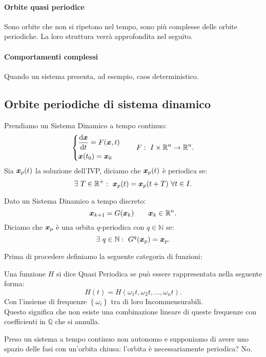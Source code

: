 \paragraph{Orbite quasi periodice}%
\label{par:Orbite quasi periodice}
Sono orbite che non si ripetono nel tempo, sono più complesse delle orbite periodiche. La loro struttura verrà approfondita nel seguito.
\paragraph{Comportamenti complessi}%
\label{par:Comportamenti complessi}
Quando un sistema presenta, ad esempio, caos deterministico.
\subsection{Orbite periodiche di sistema dinamico}%
\label{sub:Orbite periodiche di sistema dinamico}
\begin{defn}
Prendiamo un Sistema Dinamico a tempo continuo:
\[
    \begin{dcases}
	\frac{\text{d} \boldsymbol{x}}{\text{d} t} = F(\boldsymbol{x}, t)\\
	\boldsymbol{x} (t_0) = \boldsymbol{x}_0
    \end{dcases}
    \qquad
    F: \ I \times \mathbb{R}^n \to \mathbb{R}^n
.\] 
 Sia $\boldsymbol{x}_p(t)$ la soluzione dell'IVP, diciamo che $\boldsymbol{x}_p(t)$ è periodica se:
\[
    \exists \ T \in \mathbb{R}^+: \ \boldsymbol{x}_p(t) = \boldsymbol{x}_p (t + T) \  \forall t \in I
.\]    
\end{defn}
\noindent
\begin{defn}
    Dato un Sistema Dinamico a tempo discreto:
    \[
	\boldsymbol{x}_{k+1} = G(\boldsymbol{x}_k) \qquad \boldsymbol{x}_k \in \mathbb{R}^n
    .\] 
    Diciamo che $\boldsymbol{x}_p$ è una orbita $q$-periodica con $q \in \mathbb{N}$ se:
    \[
	\exists \ q \in \mathbb{N}: \
	G^{q} (\boldsymbol{x}_p) = \boldsymbol{x}_p
    .\] 
\end{defn}
\noindent
Prima di procedere definiamo la seguente categoria di funzioni:
\begin{defn}
    Una funzione $H$ si dice Quasi Periodica se può essere rappresentata nella seguente forma:
    \[
	H(t) = H(\omega_1t, \omega_2t, \ldots, \omega_nt)
    .\] 
    Con l'insieme di frequenze $\left\{\omega_i\right\}$ tra di loro Incommensurabili.\\
    Questo significa che non esiste una combinazione lineare di queste frequenze con coefficienti in $\mathbb{Q}$ che si annulla.
\end{defn}
\noindent
Preso un sistema a tempo continuo non autonomo e supponiamo di avere uno spazio delle fasi con un'orbita chiusa: l'orbita è necessariamente periodica? No.
